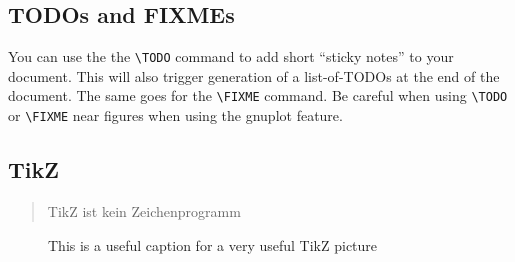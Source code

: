 \subsection{TODOs and FIXMEs}

You can use the the \verb|\TODO| command to add short ``sticky notes'' to your document. 
This will also trigger generation of a list-of-TODOs at the end of the document. 
The same goes for the \verb|\FIXME| command.
Be careful when using \verb|\TODO| or \verb|\FIXME| near figures when using the gnuplot feature.

\subsection{TikZ}

\begin{quote}
  TikZ ist kein Zeichenprogramm
\end{quote}

\begin{figure}[h]\centering
{}
\caption{This is a useful caption for a very useful TikZ picture}
\end{figure}
